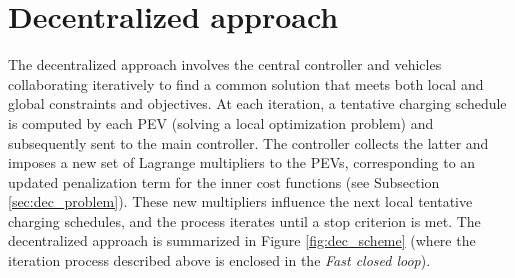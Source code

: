\section{Decentralized approach}
The decentralized approach involves the central controller and vehicles collaborating iteratively to find a common solution that meets both local and global constraints and objectives. At each iteration, a tentative charging schedule is computed by each PEV (solving a local optimization problem) and subsequently sent to the main controller. The controller collects the latter and imposes a new set of Lagrange multipliers to the PEVs, corresponding to an updated penalization term for the inner cost functions (see Subsection \ref{sec:dec_problem}). These new multipliers influence the next local tentative charging schedules, and the process iterates until a stop criterion is met. The decentralized approach is summarized in Figure \ref{fig:dec_scheme} (where the iteration process described above is enclosed in the \textit{Fast closed loop}).



